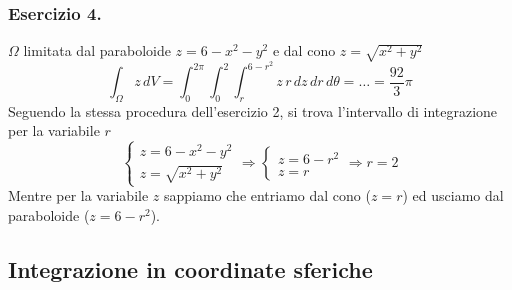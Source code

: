 \documentclass[10pt]{article}
\theoremstyle{plain}
\theoremstyle{definition}
\begin{document}
\subsubsection{Esercizio 4.}
$\Omega$ limitata dal paraboloide $z=6-x^2-y^2$ e dal cono $z=\sqrt{x^2+y^2}$
$$\int_{\Omega} z\,dV = \int_0^{2\pi}\int_0^{2}\int_{r}^{6-r^2} z\,r\,dz\,dr\,d\theta = \ldots = \frac{92}{3} \pi$$
Seguendo la stessa procedura dell'esercizio 2, si trova l'intervallo di integrazione per la variabile $r$
$$\begin{cases}
 z=6-x^2-y^2 \\ z=\sqrt{x^2+y^2}
\end{cases} \Rightarrow 
\begin{cases}
 z=6-r^2 \\ z=r
\end{cases}\Rightarrow r=2$$
Mentre per la variabile $z$ sappiamo che entriamo dal cono ($z=r$) ed usciamo dal paraboloide ($z=6-r^2$).

\subsection{Integrazione in coordinate sferiche}
\end{document}
